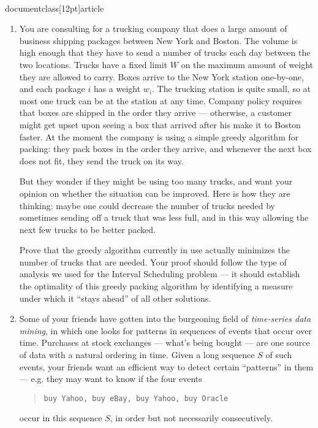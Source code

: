 \\documentclass[12pt]{article}
\begin{document}
\begin{enumerate}


\item 

You are consulting for a trucking company that does a large 
amount of business shipping packages between New York and Boston.
The volume is high enough that they have to send
a number of trucks each day between the two locations. Trucks have a
fixed limit $W$ on the maximum amount of weight they are allowed to carry.
Boxes arrive to the New York station one-by-one, and each package $i$ has
a weight $w_i$. The trucking station is quite small, so at most one truck
can be at the station at any time. Company policy requires that boxes
are shipped in the order they arrive --- otherwise, a customer might
get upset upon seeing a box that arrived after his make it to Boston faster.
At the moment the company is using a simple greedy algorithm for packing:
they pack boxes in the order they arrive, 
and whenever the next box does not fit, they send the truck on its way. 

But they wonder if they might be using too many
trucks, and want your opinion on whether the situation can be
improved. Here is how they are thinking: maybe one could decrease the number
of trucks needed by sometimes sending off a truck that was less full,
and in this way allowing the next few trucks to be better packed.

Prove that the greedy algorithm currently in use actually minimizes the
number of trucks that are needed.  Your proof should follow the type of
analysis we used for the Interval Scheduling problem --- it should
establish the optimality of this greedy packing algorithm
by identifying a measure under which it ``stays ahead''
of all other solutions.


\item 

Some of your friends have gotten into the
burgeoning field of {\em time-series data mining},
in which one looks for patterns in sequences of
events that occur over time.
Purchases at stock exchanges --- what's
being bought --- are one source
of data with a natural ordering in time.
Given a long sequence $S$ of such events, your friends
want an efficient way to detect certain
``patterns'' in them --- e.g. they may want
to know if the four events
\begin{quote}
{\tt buy Yahoo, buy eBay, buy Yahoo, buy Oracle}
\end{quote}
occur in this sequence $S$, in order but not necessarily consecutively.


\end{enumerate}
\end{document}
